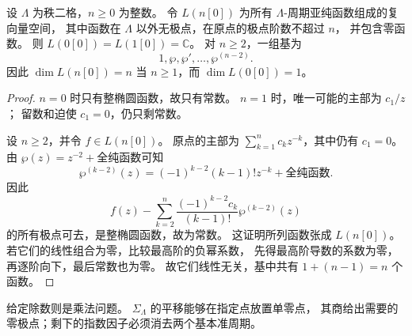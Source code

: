\begin{proposition}[单极点空间的显式基]\label{b3:prop:22-one-pole-space}
设 \(\Lambda\) 为秩二格，\(n\ge0\) 为整数。
令 \(L(n[0])\) 为所有 \(\Lambda\)-周期亚纯函数组成的复向量空间，
其中函数在 \(\Lambda\) 以外无极点，在原点的极点阶数不超过 \(n\)，
并包含零函数。
则 \(L(0[0])=L(1[0])=\mathbb C\)。
对 \(n\ge2\)，一组基为
\[
 1,\wp,\wp',\ldots,\wp^{(n-2)}.
\]
因此 \(\dim L(n[0])=n\) 当 \(n\ge1\)，而 \(\dim L(0[0])=1\)。
\end{proposition}
\begin{proof}
\(n=0\) 时只有整椭圆函数，故只有常数。
\(n=1\) 时，唯一可能的主部为 \(c_1/z\)；
留数和迫使 \(c_1=0\)，仍只剩常数。

设 \(n\ge2\)，并令 \(f\in L(n[0])\)。
原点的主部为 \(\sum_{k=1}^n c_kz^{-k}\)，其中仍有 \(c_1=0\)。
由 \(\wp(z)=z^{-2}+\)全纯函数可知
\[
 \wp^{(k-2)}(z)
 =(-1)^{k-2}(k-1)!z^{-k}+\text{全纯函数}.
\]
因此
\[
 f(z)-\sum_{k=2}^n
       \frac{(-1)^{k-2}c_k}{(k-1)!}\wp^{(k-2)}(z)
\]
的所有极点可去，是整椭圆函数，故为常数。
这证明所列函数张成 \(L(n[0])\)。
若它们的线性组合为零，比较最高阶的负幂系数，
先得最高阶导数的系数为零，再逐阶向下，最后常数也为零。
故它们线性无关，基中共有 \(1+(n-1)=n\) 个函数。
\end{proof}

给定除数则是乘法问题。
\(\Sigma_\Lambda\) 的平移能够在指定点放置单零点，
其商给出需要的零极点；剩下的指数因子必须消去两个基本准周期。

